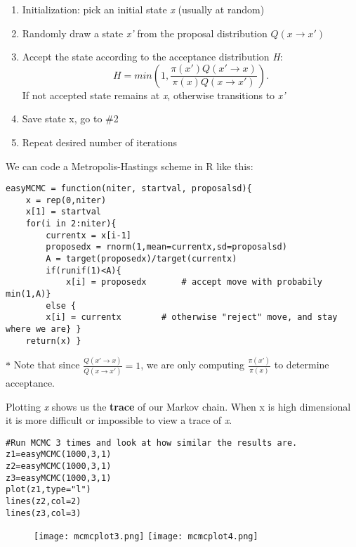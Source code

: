 \documentclass[12pt]{report}
\begin{document}
\begin{enumerate}
\item Initialization: pick an initial state \textit{x} (usually at random)
\item Randomly draw a state \textit{x'} from the proposal distribution $Q\left ( x \rightarrow {x}' \right )$
\item Accept the state according to the acceptance distribution \textit{H}:
\begin{equation}
H = min\left (1, \frac{\pi \left ( {x}' \right ) Q\left ( {x}' \rightarrow x \right )}{\pi\left ( x \right ) Q\left ( x\rightarrow {x}' \right )} \right ).
\end{equation}
If not accepted state remains at \textit{x}, otherwise transitions to \textit{x'}
\item Save state x, go to \#2
\item Repeat desired number of iterations
\end{enumerate}
We can code a Metropolis-Hastings scheme in R like this:
\begin{lstlisting}
easyMCMC = function(niter, startval, proposalsd){
    x = rep(0,niter)
    x[1] = startval     
    for(i in 2:niter){
        currentx = x[i-1]
        proposedx = rnorm(1,mean=currentx,sd=proposalsd) 
        A = target(proposedx)/target(currentx)
        if(runif(1)<A){
            x[i] = proposedx       # accept move with probabily min(1,A)} 
        else {
        x[i] = currentx        # otherwise "reject" move, and stay where we are} }
    return(x) }
\end{lstlisting}

$\ast$ Note that since $\frac{Q\left ({x}' \rightarrow x \right )}{Q \left (x \rightarrow {x}' \right )} = 1$, we are only computing $\frac{\pi \left ({x}' \right )}{\pi \left (x \right ) }$ to determine acceptance.

Plotting \textit{x} shows us the \textbf{trace} of our Markov chain. When x is high dimensional it is more difficult or impossible to view a trace of \textit{x}.
\begin{lstlisting}
#Run MCMC 3 times and look at how similar the results are.
z1=easyMCMC(1000,3,1)
z2=easyMCMC(1000,3,1)
z3=easyMCMC(1000,3,1)
plot(z1,type="l")
lines(z2,col=2)
lines(z3,col=3)
\end{lstlisting}

\begin{figure}[!htb]
\texttt{[image: mcmcplot3.png]}
\endminipage\hfill
{}
\texttt{[image: mcmcplot4.png]}
\endminipage\hfill
\end{figure}
\end{document}
